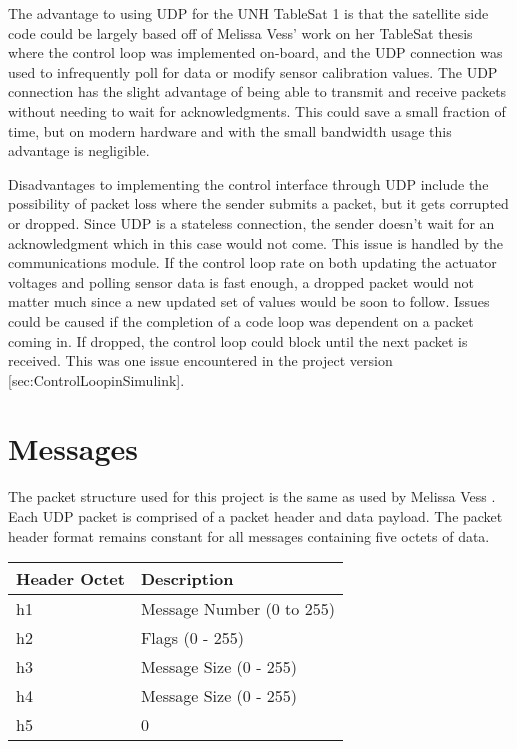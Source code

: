 The advantage to using UDP for the UNH TableSat 1 is that the satellite
side code could be largely based off of Melissa Vess' work on her
TableSat thesis where the control loop was implemented on-board, and
the UDP connection was used to infrequently poll for data or modify
sensor calibration values.  The UDP connection has the slight advantage
of being able to transmit and receive packets without needing to wait for
acknowledgments.  This could save a small fraction of time, but on modern
hardware and with the small bandwidth usage this advantage is negligible.

Disadvantages to implementing the control interface through UDP include
the possibility of packet loss where the sender submits a packet, but
it gets corrupted or dropped.  Since UDP is a stateless connection, the
sender doesn't wait for an acknowledgment which in this case would not come.
This issue is handled by the communications module.  If the control loop rate
on both updating the actuator voltages and polling sensor data is fast enough,
a dropped packet would not matter much since a new updated set of values
would be soon to follow.  Issues could be caused if the completion of a
code loop was dependent on a packet coming in.  If dropped, the control
loop could block until the next packet is received.  This was one issue
encountered in the project version [sec:ControlLoopinSimulink].


\section{Messages}
\label{sec:Messages}


The packet structure used for this project is the same as used by Melissa Vess .
Each UDP packet is comprised of a packet header and data payload.  The packet
header format remains constant for all messages containing five octets of data.

\begin{center}
    \begin{tabular}{| l | l |}
    \hline
    Header Octet & Description \\ \hline
    h1 & Message Number (0 to 255) \\ \hline
    h2 & Flags (0 - 255) \\ \hline
    h3 & Message Size (0 - 255) \\ \hline
    h4 & Message Size (0 - 255) \\ \hline
    h5 & 0 \\ \hline
    \end{tabular}
\end{center}

